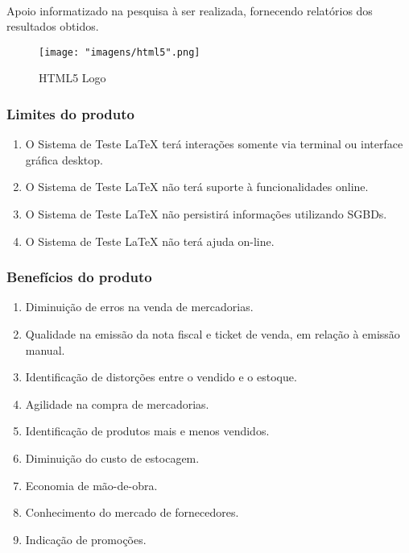 \documentclass[12pt]{article}
\begin{document}
			\paragraph{}Apoio informatizado na pesquisa à ser realizada, fornecendo relatórios dos resultados obtidos.
			
			\begin{figure}[!h]
				\caption{HTML5 Logo}
				\centering
				\texttt{[image: "imagens/html5".png]}
			\end{figure}
				
		\subsubsection{Limites do produto}
			\begin{enumerate}
					\item O Sistema de Teste LaTeX terá interações somente via terminal ou interface gráfica desktop.
					\item O Sistema de Teste LaTeX não terá suporte à funcionalidades online.
					\item O Sistema de Teste LaTeX não persistirá informações utilizando SGBDs.
					\item O Sistema de Teste LaTeX não terá ajuda on-line.
			\end{enumerate}
						
		\subsubsection{Benefícios do produto}
			\begin{enumerate}
				\item Diminuição de erros na  venda de mercadorias.
				\item Qualidade na emissão da nota fiscal e ticket de venda, em relação à emissão manual.
				\item Identificação de distorções entre o vendido e o estoque.
				\item Agilidade na compra de mercadorias.
				\item Identificação de produtos mais e menos vendidos.
				\item Diminuição do custo de estocagem.
				\item Economia de mão-de-obra.
				\item Conhecimento do mercado de fornecedores.
				\item Indicação de promoções.
			\end{enumerate}
			
\end{document}
